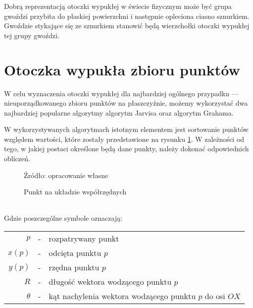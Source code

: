     Dobrą reprezentacją otoczki wypukłej w świecie fizycznym może być grupa gwoździ przybita do płaskiej powierzchni i następnie opleciona ciasno sznurkiem. Gwoździe stykające się ze sznurkiem stanowić będą wierzchołki otoczki wypukłej tej grupy gwoździ.
        \section{Otoczka wypukła zbioru punktów}
        W celu wyznaczenia otoczki wypukłej dla najbardziej ogólnego przypadku --- nieuporządkowanego zbioru punktów na płaszczyźnie, możemy wykorzystać dwa najbardziej popularne algorytmy algorytm Jarvisa oraz algorytm Grahama.
        
        W wykorzystywanych algorytmach istotnym elementem jest sortowanie punktów względem wartości, które zostały przedstawione na rysunku \ref{fig:axis}. W zależności od tego, w jakiej postaci określone będą dane punkty, należy dokonać odpowiednich obliczeń.
        \begin{figure}[h!]
        	\begin{center}
    			
    			\caption{Punkt na układzie współrzędnych}\label{fig:axis}
    			
    			Źródło: opracowanie własne
    	\end{center}
    	\end{figure}\vspace{-8 mm}\\
    	Gdzie poszczególne symbole oznaczają:\\
    	\begin{tabular}{rcl}
    	$p$ & - & rozpatrywany punkt\\
    	$x\left( p \right)$ & - & odcięta punktu $p$\\
    	$y\left( p \right)$ & - & rzędna punktu $p$\\
    	$R$ & - & długość wektora wodzącego punktu $p$\\
    	$\theta$ & - & kąt nachylenia wektora wodzącego punktu $p$ do osi $OX$
    	\end{tabular}\\
    	
